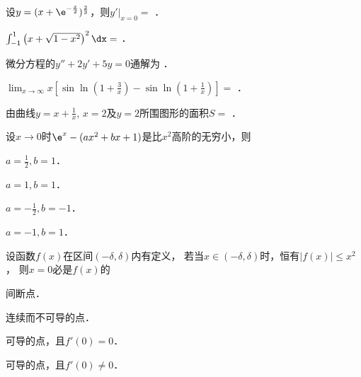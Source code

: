 \documentclass[plain,noanswer,medmath]{../../template/jnuexam}
\begin{document}




\begin{problem}
设$y = (x + \e^{-\frac{x}{2}})^{\frac{2}{3}}$，则$y'|_{x = 0} =$ \fillin{}．
\end{problem}


\begin{problem}
$\int_{-1}^1\left(x + \sqrt{1 - x^2} \right)^2 \dx =$ \fillin{}．
\end{problem}


\begin{problem}
微分方程的$y'' + 2y' + 5y = 0$通解为 \fillin{}．
\end{problem}


\begin{problem}
$\lim_{x \to \infty} x\left[\sin \ln \left(1 + \frac{3}{x} \right)
  - \sin \ln \left(1 + \frac{1}{x} \right) \right] =$ \fillin{}．
\end{problem}


\begin{problem}
由曲线$y = x + \frac{1}{x}$, $x = 2$及$y = 2$所围图形的面积$S=$ \fillin{}．
\end{problem}




\begin{problem}
设$x \to 0$时$\e^x - (ax^2 + bx + 1)$是比$x^2$高阶的无穷小，则\pickout{}
\begin{abcd}
\item $a = \frac{1}{2},b = 1$．		
\item $a = 1,b = 1$．
\item $a = - \frac{1}{2},b = - 1$．		
\item $a = - 1,b = 1$．
\end{abcd}
\end{problem}


\begin{problem}
设函数$f(x)$在区间$(- \delta ,\delta)$内有定义，
若当$x \in(- \delta ,\delta)$时，恒有$\left| f(x) \right| \le x^2$，
则$x = 0$必是$f(x)$的\pickout{}
\begin{abcd}
\item 间断点． 							
\item 连续而不可导的点．
\item 可导的点，且$f'(0) = 0$．			
\item 可导的点，且$f'(0) \ne 0$．
\end{abcd}
\end{problem}
\end{document}
